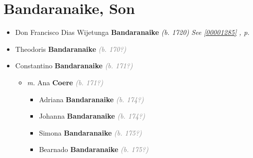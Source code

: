\documentclass[10pt, openany]{book}
\begin{document}
\chapter{Bandaranaike, Son}
\label{00001034}
\textcolor{slmaroon}{\textit{}}
\begin{itemize}
\item{Don Francisco Dias Wijetunga \textbf{Bandaranaike} \textcolor{slorange}{\textit{(b. 1720)}} \textcolor{slteal}{\textit{See  \autoref{00001285} \textit{, p. \pageref{00001285} }}}}
\item{Theodoris \textbf{Bandaranaike} \textcolor{gray}{\textit{(b. 170?)}}
 }
\item{Constantino \textbf{Bandaranaike} \textcolor{gray}{\textit{(b. 171?)}}
\begin{itemize}
\item{\textit{m.} Ana \textbf{Coere} \textcolor{gray}{\textit{(b. 171?)}}   \label{couple:00001277:00001278} \begin{itemize}
\item{Adriana \textbf{Bandaranaike} \textcolor{gray}{\textit{(b. 174?)}}
 }
\item{Johanna \textbf{Bandaranaike} \textcolor{gray}{\textit{(b. 174?)}}
 }
\item{Simona \textbf{Bandaranaike} \textcolor{gray}{\textit{(b. 175?)}}
 }
\item{Bearnado \textbf{Bandaranaike} \textcolor{gray}{\textit{(b. 175?)}}
 }
\end{itemize}}
\end{itemize}
 }
\end{itemize}
 
\end{document}
